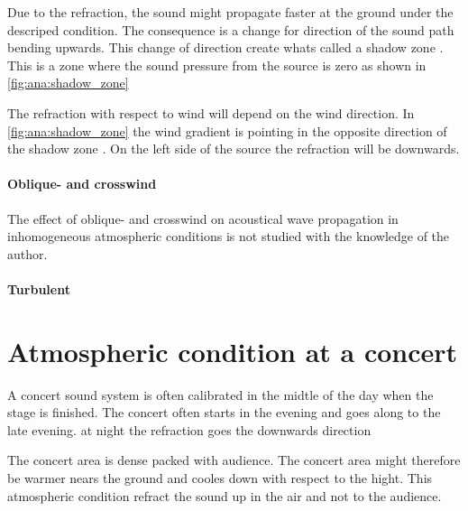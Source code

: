 
Due to the refraction, the sound might propagate faster at the ground under the descriped condition. The consequence is a change for direction of the sound path bending upwards. This change of direction create whats called a shadow zone \citep{asmos_acous_2016}. This is a zone where the sound pressure from the source is zero as shown in \autoref{fig:ana:shadow_zone}



The refraction with respect to wind will depend on the wind direction. In \autoref{fig:ana:shadow_zone} the wind gradient is pointing in the opposite direction of the shadow zone . On the left side of the source the refraction will be downwards.

\paragraph{Oblique- and crosswind} The effect of oblique- and crosswind on acoustical wave propagation in inhomogeneous atmospheric conditions is not studied with the knowledge of the author. 

\paragraph{Turbulent}

 \section{Atmospheric condition at a concert}
A concert sound system is often calibrated in the midtle of the day when the stage is finished. The concert often starts in the evening and goes along to the late evening. at night the refraction goes the downwards direction 

The concert area is dense packed with audience. The concert area might therefore be warmer nears the ground and cooles down with respect to the hight. This atmospheric condition refract the sound up in the air and not to the audience. 














